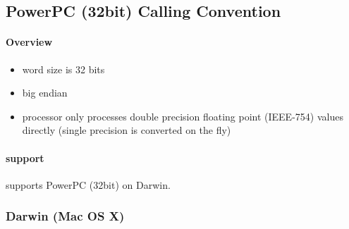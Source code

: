 %
%
%
%

\subsection{PowerPC (32bit) Calling Convention}

\paragraph{Overview}

\begin{itemize}
\item word size is 32 bits
\item big endian
\item processor only processes double precision floating point (IEEE-754) values directly (single precision is converted on the fly)
\end{itemize}


\paragraph{ support}

 supports PowerPC (32bit) on Darwin.


\subsubsection{Darwin (Mac OS X)}

